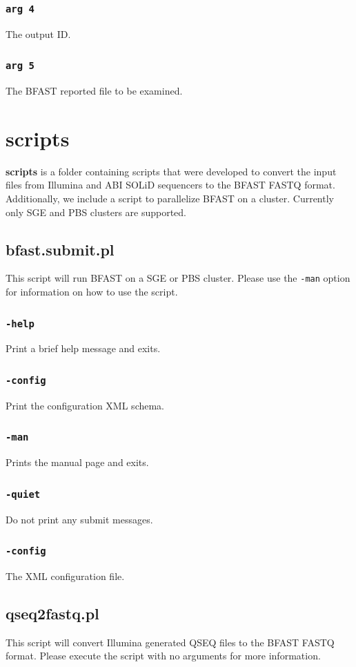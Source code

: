\documentclass[a4paper,12pt]{book}
\newcommand{\TT}[1]{{\tt #1}} %
\newcommand{\BF}[1]{{\bf #1}} %
\newcommand{\BRF}{BFAST reported file} %
\begin{document}
\subsubsection{\TT{arg 4}}
The output ID.
\subsubsection{\TT{arg 5}}
The \BRF{} to be examined.
\section{scripts}
\label{sec:scripts}
\BF{scripts} is a folder containing scripts that were developed to convert the input files from Illumina and ABI SOLiD sequencers to the BFAST FASTQ format.
Additionally, we include a script to parallelize BFAST on a cluster.
Currently only SGE and PBS clusters are supported.

\subsection{bfast.submit.pl}
This script will run BFAST on a SGE or PBS cluster.
Please use the \TT{-man} option for information on how to use the script.
\subsubsection{\TT{-help}}
Print a brief help message and exits.
\subsubsection{\TT{-config}}
Print the configuration XML schema.
\subsubsection{\TT{-man}}
Prints the manual page and exits.
\subsubsection{\TT{-quiet}}
Do not print any submit messages.
\subsubsection{\TT{-config}}
The XML configuration file.
\subsection{qseq2fastq.pl}
This script will convert Illumina generated QSEQ files to the BFAST FASTQ format.
Please execute the script with no arguments for more information.
\end{document}
